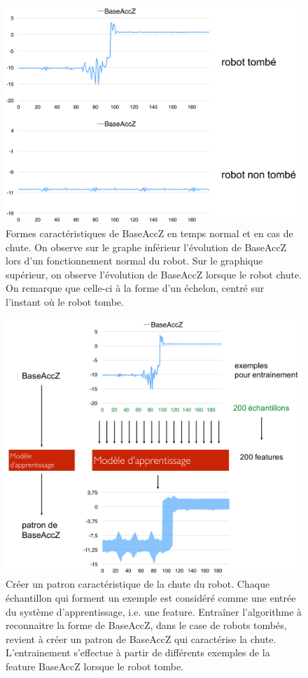 \begin{figure}[h]
	\centering\includegraphics[width=12cm]{images/fall_not_fall.png}
	\caption[Formes caractéristiques de BaseAccZ en temps normal et en cas de chute]{Formes caractéristiques de BaseAccZ en temps normal et en cas de chute. On observe sur le graphe inférieur l'évolution de BaseAccZ lors d'un fonctionnement normal du robot. Sur le graphique supérieur, on observe l'évolution de BaseAccZ lorsque le robot chute. On remarque que celle-ci à la forme d'un échelon, centré sur l'instant où le robot tombe.}
	\label{fig:Formes caractéristiques de BaseAccZ en temps normal et en cas de chute}
\end{figure}

\begin{figure}[h]
	\centering\includegraphics[width=12cm]{images/patron.png}
	\caption[Créer un patron caractéristique de la chute du robot]{Créer un patron caractéristique de la chute du robot. Chaque échantillon qui forment un exemple est considéré comme une entrée du système d'apprentissage, i.e. une feature. Entraîner l'algorithme à reconnaitre la forme de BaseAccZ, dans le case de robots tombés, revient à créer un patron de BaseAccZ qui caractérise la chute. L'entrainement s'effectue à partir de différents exemples de la feature BaseAccZ lorsque le robot tombe.}
	\label{fig:Créer un patron caractéristique de la chute du robot}
\end{figure}

